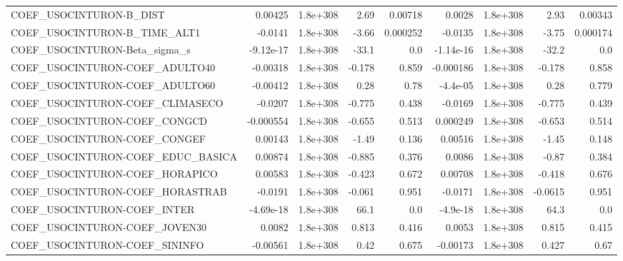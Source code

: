 \begin{tabular}{lrrrrrrrr}
COEF\_USOCINTURON-B\_DIST           &     0.00425 &     1.8e+308 &      2.69 &  0.00718 &     0.0028 &    1.8e+308 &         2.93 &       0.00343 \\
COEF\_USOCINTURON-B\_TIME\_ALT1      &     -0.0141 &     1.8e+308 &     -3.66 & 0.000252 &    -0.0135 &    1.8e+308 &        -3.75 &      0.000174 \\
COEF\_USOCINTURON-Beta\_sigma\_s     &   -9.12e-17 &     1.8e+308 &     -33.1 &      0.0 &  -1.14e-16 &    1.8e+308 &        -32.2 &           0.0 \\
COEF\_USOCINTURON-COEF\_ADULTO40    &    -0.00318 &     1.8e+308 &    -0.178 &    0.859 &  -0.000186 &    1.8e+308 &       -0.178 &         0.858 \\
COEF\_USOCINTURON-COEF\_ADULTO60    &    -0.00412 &     1.8e+308 &      0.28 &     0.78 &   -4.4e-05 &    1.8e+308 &         0.28 &         0.779 \\
COEF\_USOCINTURON-COEF\_CLIMASECO   &     -0.0207 &     1.8e+308 &    -0.775 &    0.438 &    -0.0169 &    1.8e+308 &       -0.775 &         0.439 \\
COEF\_USOCINTURON-COEF\_CONGCD      &   -0.000554 &     1.8e+308 &    -0.655 &    0.513 &   0.000249 &    1.8e+308 &       -0.653 &         0.514 \\
COEF\_USOCINTURON-COEF\_CONGEF      &     0.00143 &     1.8e+308 &     -1.49 &    0.136 &    0.00516 &    1.8e+308 &        -1.45 &         0.148 \\
COEF\_USOCINTURON-COEF\_EDUC\_BASICA &     0.00874 &     1.8e+308 &    -0.885 &    0.376 &     0.0086 &    1.8e+308 &        -0.87 &         0.384 \\
COEF\_USOCINTURON-COEF\_HORAPICO    &     0.00583 &     1.8e+308 &    -0.423 &    0.672 &    0.00708 &    1.8e+308 &       -0.418 &         0.676 \\
COEF\_USOCINTURON-COEF\_HORASTRAB   &     -0.0191 &     1.8e+308 &    -0.061 &    0.951 &    -0.0171 &    1.8e+308 &      -0.0615 &         0.951 \\
COEF\_USOCINTURON-COEF\_INTER       &   -4.69e-18 &     1.8e+308 &      66.1 &      0.0 &   -4.9e-18 &    1.8e+308 &         64.3 &           0.0 \\
COEF\_USOCINTURON-COEF\_JOVEN30     &      0.0082 &     1.8e+308 &     0.813 &    0.416 &     0.0053 &    1.8e+308 &        0.815 &         0.415 \\
COEF\_USOCINTURON-COEF\_SININFO     &    -0.00561 &     1.8e+308 &      0.42 &    0.675 &   -0.00173 &    1.8e+308 &        0.427 &          0.67 \\

\end{tabular}
